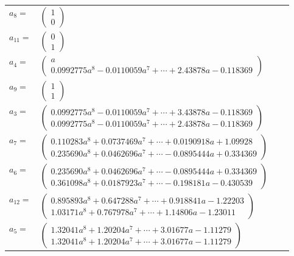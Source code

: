 \documentclass[1p]{elsarticle_modified}
\theoremstyle{definition}
\begin{document}
\begin{tabular}{m{7pt} m{180pt} m{7pt} m{180pt} }
\flushright $a_{8}=$&$\begin{pmatrix}1\\0\end{pmatrix}$ \\
\flushright $a_{11}=$&$\begin{pmatrix}0\\1\end{pmatrix}$ \\
\flushright $a_{4}=$&$\begin{pmatrix}a\\0.0992775 a^{8}-0.0110059 a^{7}+\cdots+2.43878 a-0.118369\end{pmatrix}$ \\
\flushright $a_{9}=$&$\begin{pmatrix}1\\1\end{pmatrix}$ \\
\flushright $a_{3}=$&$\begin{pmatrix}0.0992775 a^{8}-0.0110059 a^{7}+\cdots+3.43878 a-0.118369\\0.0992775 a^{8}-0.0110059 a^{7}+\cdots+2.43878 a-0.118369\end{pmatrix}$ \\
\flushright $a_{7}=$&$\begin{pmatrix}0.110283 a^{8}+0.0737469 a^{7}+\cdots+0.0190918 a+1.09928\\0.235690 a^{8}+0.0462696 a^{7}+\cdots-0.0895444 a+0.334369\end{pmatrix}$ \\
\flushright $a_{6}=$&$\begin{pmatrix}0.235690 a^{8}+0.0462696 a^{7}+\cdots-0.0895444 a+0.334369\\0.361098 a^{8}+0.0187923 a^{7}+\cdots-0.198181 a-0.430539\end{pmatrix}$ \\
\flushright $a_{12}=$&$\begin{pmatrix}0.895893 a^{8}+0.647288 a^{7}+\cdots+0.918841 a-1.22203\\1.03171 a^{8}+0.767978 a^{7}+\cdots+1.14806 a-1.23011\end{pmatrix}$ \\
\flushright $a_{5}=$&$\begin{pmatrix}1.32041 a^{8}+1.20204 a^{7}+\cdots+3.01677 a-1.11279\\1.32041 a^{8}+1.20204 a^{7}+\cdots+3.01677 a-1.11279\end{pmatrix}$ \\

\end{tabular}
\end{document}
